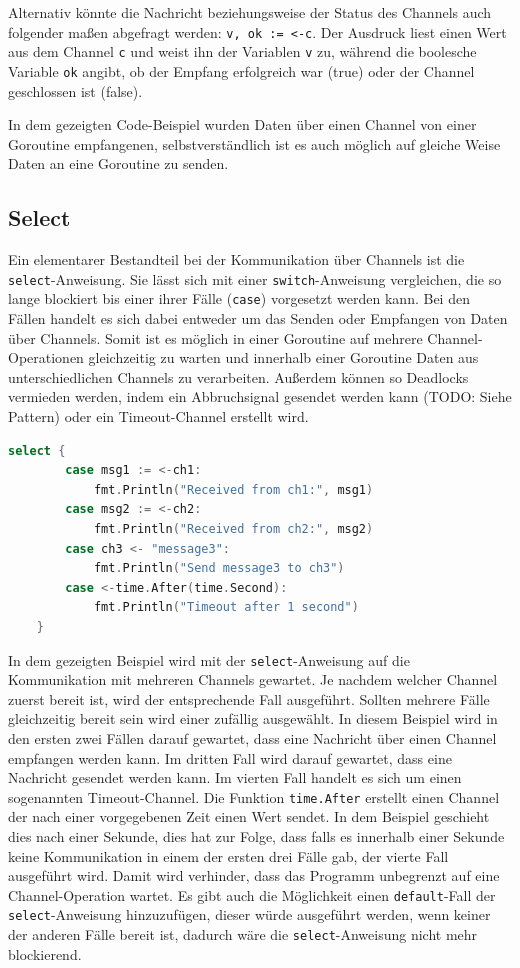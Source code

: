 \documentclass[fontsize=12pt,paper=a4,twoside=semi,parskip=half-,headsepline,headinclude]{scrreprt}
\begin{document}
Alternativ könnte die Nachricht beziehungsweise der Status des Channels auch folgender maßen abgefragt werden: \texttt{v, ok := <-c}. Der Ausdruck liest einen Wert aus dem Channel \texttt{c} und weist ihn der Variablen \texttt{v} zu, während die boolesche Variable \texttt{ok} angibt, ob der Empfang erfolgreich war (true) oder der Channel geschlossen ist (false).

In dem gezeigten Code-Beispiel wurden Daten über einen Channel von einer Goroutine empfangenen, selbstverständlich ist es auch möglich auf gleiche Weise Daten an eine Goroutine zu senden.

\subsection{Select}

Ein elementarer Bestandteil bei der Kommunikation über Channels ist die \texttt{select}-Anweisung. Sie lässt sich mit einer \texttt{switch}-Anweisung vergleichen, die so lange blockiert bis einer ihrer Fälle (\texttt{case}) vorgesetzt werden kann. Bei den Fällen handelt es sich dabei entweder um das Senden oder Empfangen von Daten über Channels. Somit ist es möglich in einer Goroutine auf mehrere Channel-Operationen gleichzeitig zu warten und innerhalb einer Goroutine Daten aus unterschiedlichen Channels zu verarbeiten. Außerdem können so Deadlocks vermieden werden, indem ein Abbruchsignal gesendet werden kann (TODO: Siehe Pattern) oder ein Timeout-Channel erstellt wird.

\begin{lstlisting}[language=Go,extendedchars=true]
	select {
		case msg1 := <-ch1:
			fmt.Println("Received from ch1:", msg1)
		case msg2 := <-ch2:
			fmt.Println("Received from ch2:", msg2)
		case ch3 <- "message3":
			fmt.Println("Send message3 to ch3")
		case <-time.After(time.Second):
			fmt.Println("Timeout after 1 second")
	}
\end{lstlisting}

In dem gezeigten Beispiel wird mit der \texttt{select}-Anweisung auf die Kommunikation mit mehreren Channels gewartet. Je nachdem welcher Channel zuerst bereit ist, wird der entsprechende Fall ausgeführt. Sollten mehrere Fälle gleichzeitig bereit sein wird einer zufällig ausgewählt. In diesem Beispiel wird in den ersten zwei Fällen darauf gewartet, dass eine Nachricht über einen Channel empfangen werden kann. Im dritten Fall wird darauf gewartet, dass eine Nachricht gesendet werden kann. Im vierten Fall handelt es sich um einen sogenannten Timeout-Channel. Die Funktion \texttt{time.After} erstellt einen Channel der nach einer vorgegebenen Zeit einen Wert sendet. In dem Beispiel geschieht dies nach einer Sekunde, dies hat zur Folge, dass falls es innerhalb einer Sekunde keine Kommunikation in einem der ersten drei Fälle gab, der vierte Fall ausgeführt wird. Damit wird verhinder, dass das Programm unbegrenzt auf eine Channel-Operation wartet. Es gibt auch die Möglichkeit einen \texttt{default}-Fall der \texttt{select}-Anweisung hinzuzufügen, dieser würde ausgeführt werden, wenn keiner der anderen Fälle bereit ist, dadurch wäre die \texttt{select}-Anweisung nicht mehr blockierend.
\end{document}
